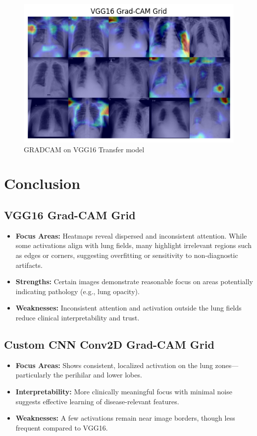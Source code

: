 \documentclass{article}
\begin{document}
\begin{figure}[ht] %
    \centering
    \includegraphics[width=1.0\linewidth]{vgg16gradcam.png}
    \caption{GRADCAM on VGG16 Transfer model}
    \label{fig:gradcam_vgg16}
\end{figure}



\section{Conclusion}

\subsection{VGG16 Grad-CAM Grid}
\begin{itemize}
    \item \textbf{Focus Areas:} Heatmaps reveal dispersed and inconsistent attention. While some activations align with lung fields, many highlight irrelevant regions such as edges or corners, suggesting overfitting or sensitivity to non-diagnostic artifacts.
    \item \textbf{Strengths:} Certain images demonstrate reasonable focus on areas potentially indicating pathology (e.g., lung opacity).
    \item \textbf{Weaknesses:} Inconsistent attention and activation outside the lung fields reduce clinical interpretability and trust.
\end{itemize}

\subsection{Custom CNN Conv2D Grad-CAM Grid}
\begin{itemize}
    \item \textbf{Focus Areas:} Shows consistent, localized activation on the lung zones—particularly the perihilar and lower lobes.
    \item \textbf{Interpretability:} More clinically meaningful focus with minimal noise suggests effective learning of disease-relevant features.
    \item \textbf{Weaknesses:} A few activations remain near image borders, though less frequent compared to VGG16.
\end{itemize}
\end{document}
